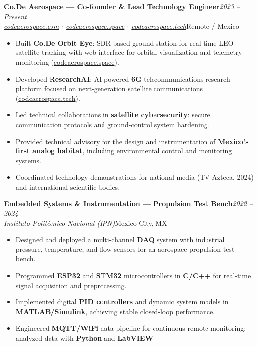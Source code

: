 \documentclass[10pt, letterpaper]{article}
\newcommand{\cventry}[4]{%
  \vspace{2pt}%
  {\color{azuloscuro}\textbf{#1}}\hfill{\small\color{gristexto}\textit{#2}}\\[-3pt]
  {\small\color{azulmedio}\textit{#3}}\hfill{\small\color{gristexto}#4}%
  \vspace{1pt}%
}
\begin{document}
\cventry{Co.De Aerospace --- Co-founder \& Lead Technology Engineer}{2023 -- Present}{\href{https://codeaerospace.com}{codeaerospace.com} $\cdot$ \href{https://codeaerospace.space}{codeaerospace.space} $\cdot$ \href{https://codeaerospace.tech}{codeaerospace.tech}}{Remote / Mexico}
\begin{itemize}
  \item Built \textbf{Co.De Orbit Eye}: SDR-based ground station for real-time LEO satellite tracking with web interface for orbital visualization and telemetry monitoring (\href{https://codeaerospace.space}{codeaerospace.space}).
  \item Developed \textbf{ResearchAI}: AI-powered \textbf{6G} telecommunications research platform focused on next-generation satellite communications (\href{https://codeaerospace.tech}{codeaerospace.tech}).
  \item Led technical collaborations in \textbf{satellite cybersecurity}: secure communication protocols and ground-control system hardening.
  \item Provided technical advisory for the design and instrumentation of \textbf{Mexico's first analog habitat}, including environmental control and monitoring systems.
  \item Coordinated technology demonstrations for national media (TV Azteca, 2024) and international scientific bodies.
\end{itemize}

\vspace{2pt}

\cventry{Embedded Systems \& Instrumentation --- Propulsion Test Bench}{2022 -- 2024}{Instituto Polit\'{e}cnico Nacional (IPN)}{Mexico City, MX}
\begin{itemize}
  \item Designed and deployed a multi-channel \textbf{DAQ} system with industrial pressure, temperature, and flow sensors for an aerospace propulsion test bench.
  \item Programmed \textbf{ESP32} and \textbf{STM32} microcontrollers in \textbf{C/C++} for real-time signal acquisition and preprocessing.
  \item Implemented digital \textbf{PID controllers} and dynamic system models in \textbf{MATLAB/Simulink}, achieving stable closed-loop performance.
  \item Engineered \textbf{MQTT/WiFi} data pipeline for continuous remote monitoring; analyzed data with \textbf{Python} and \textbf{LabVIEW}.
\end{itemize}
\end{document}
